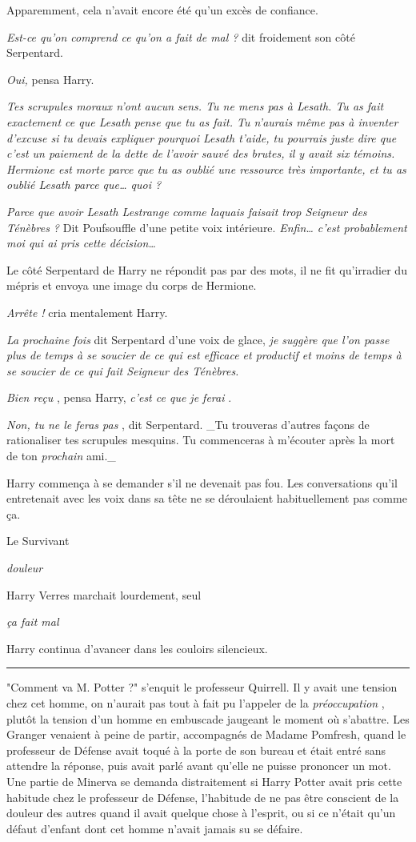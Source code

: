 Apparemment, cela n'avait encore été qu'un excès de confiance.

\emph{Est-ce qu'on comprend ce qu'on a fait de mal ?}  dit froidement son côté Serpentard.

\emph{Oui,}  pensa Harry.

\emph{Tes scrupules moraux n'ont aucun sens. Tu ne mens pas à Lesath. Tu as fait exactement ce que Lesath pense que tu as fait. Tu n'aurais même pas à inventer d'excuse si tu devais expliquer pourquoi Lesath t'aide, tu pourrais juste dire que c'est un paiement de la dette de l'avoir sauvé des brutes, il y avait six témoins. Hermione est morte parce que tu as oublié une ressource très importante, et tu as oublié Lesath parce que… quoi ?} 

\emph{Parce que avoir Lesath Lestrange comme laquais faisait trop Seigneur des Ténèbres ?}  Dit Poufsouffle d'une petite voix intérieure. \emph{Enfin… c'est probablement moi qui ai pris cette décision…} 

Le côté Serpentard de Harry ne répondit pas par des mots, il ne fit qu'irradier du mépris et envoya une image du corps de Hermione.

\emph{Arrête !}  cria mentalement Harry.

\emph{La prochaine fois}  dit Serpentard d'une voix de glace, \emph{je suggère que l'on passe plus de temps à se soucier de ce qui est efficace et productif et moins de temps à se soucier de ce qui fait Seigneur des Ténèbres.} 

\emph{Bien reçu} , pensa Harry, \emph{c'est ce que je ferai} .

\emph{Non, tu ne le feras pas} , dit Serpentard. \_Tu trouveras d'autres façons de rationaliser tes scrupules mesquins. Tu commenceras à m'écouter après la mort de ton \emph{prochain}  ami.\_

Harry commença à se demander s'il ne devenait pas fou. Les conversations qu'il entretenait avec les voix dans sa tête ne se déroulaient habituellement pas comme ça.

Le Survivant

\emph{douleur} 

Harry Verres marchait lourdement, seul

\emph{ça fait mal} 

Harry continua d'avancer dans les couloirs silencieux.
\par\noindent\rule{\textwidth}{0.4pt}
"Comment va M. Potter ?" s'enquit le professeur Quirrell. Il y avait une tension chez cet homme, on n'aurait pas tout à fait pu l'appeler de la \emph{préoccupation} , plutôt la tension d'un homme en embuscade jaugeant le moment où s'abattre. Les Granger venaient à peine de partir, accompagnés de Madame Pomfresh, quand le professeur de Défense avait toqué à la porte de son bureau et était entré sans attendre la réponse, puis avait parlé avant qu'elle ne puisse prononcer un mot. Une partie de Minerva se demanda distraitement si Harry Potter avait pris cette habitude chez le professeur de Défense, l'habitude de ne pas être conscient de la douleur des autres quand il avait quelque chose à l'esprit, ou si ce n'était qu'un défaut d'enfant dont cet homme n'avait jamais su se défaire.

